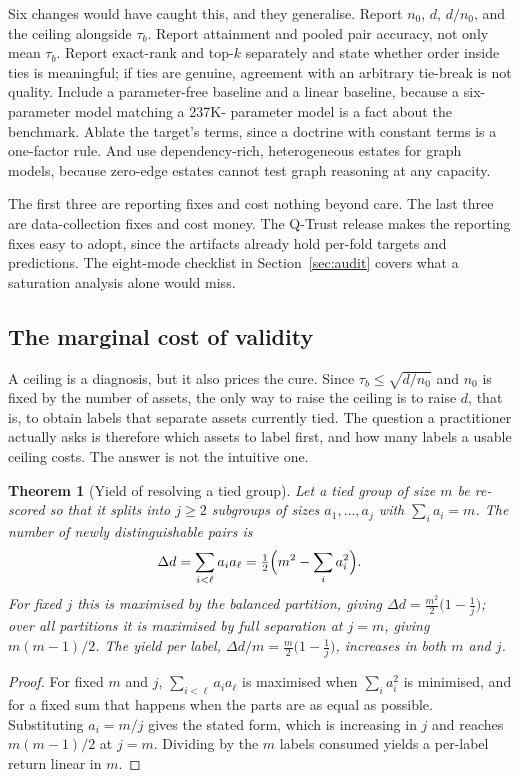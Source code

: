 \documentclass[journal,10pt]{IEEEtran}
\newtheorem{theorem}{Theorem}
\newcommand{\tb}{\tau_b}
\newcommand{\distinct}{d}
\newcommand{\nzero}{n_0}
\begin{document}
Six changes would have caught this, and they generalise. Report $\nzero$, $\distinct$,
$\distinct/\nzero$, and the ceiling alongside $\tb$. Report attainment and pooled pair accuracy, not
only mean $\tb$. Report exact-rank and top-$k$ separately and state whether order inside ties is
meaningful; if ties are genuine, agreement with an arbitrary tie-break is not quality. Include a
parameter-free baseline and a linear baseline, because a six-parameter model matching a 237K-
parameter model is a fact about the benchmark. Ablate the target's terms, since a doctrine with
constant terms is a one-factor rule. And use dependency-rich, heterogeneous estates for graph
models, because zero-edge estates cannot test graph reasoning at any capacity.

The first three are reporting fixes and cost nothing beyond care. The last three are data-collection
fixes and cost money. The Q-Trust release makes the reporting fixes easy to adopt, since the
artifacts already hold per-fold targets and predictions. The eight-mode checklist in
Section~\ref{sec:audit} covers what a saturation analysis alone would miss.

\subsection{The marginal cost of validity}
\label{sec:marginal}

A ceiling is a diagnosis, but it also prices the cure. Since $\tb\le\sqrt{\distinct/\nzero}$ and
$\nzero$ is fixed by the number of assets, the only way to raise the ceiling is to raise $\distinct$,
that is, to obtain labels that separate assets currently tied. The question a practitioner actually
asks is therefore which assets to label first, and how many labels a usable ceiling costs. The
answer is not the intuitive one.

\begin{theorem}[Yield of resolving a tied group]
\label{thm:bisect}
Let a tied group of size $m$ be re-scored so that it splits into $j\ge2$ subgroups of sizes
$a_1,\dots,a_j$ with $\sum_i a_i=m$. The number of newly distinguishable pairs is
\begin{equation}
\Delta\distinct=\sum_{i<\ell}a_i a_\ell=\tfrac{1}{2}\Bigl(m^2-\sum_i a_i^2\Bigr).
\label{eq:bisect}
\end{equation}
For fixed $j$ this is maximised by the balanced partition, giving
$\Delta\distinct=\frac{m^2}{2}\bigl(1-\frac{1}{j}\bigr)$; over all partitions it is maximised by
full separation at $j=m$, giving $m(m-1)/2$. The yield per label,
$\Delta\distinct/m=\frac{m}{2}\bigl(1-\frac{1}{j}\bigr)$, increases in both $m$ and $j$.
\end{theorem}
\begin{proof}
For fixed $m$ and $j$, $\sum_{i<\ell}a_ia_\ell$ is maximised when $\sum_i a_i^2$ is minimised, and
for a fixed sum that happens when the parts are as equal as possible. Substituting $a_i=m/j$ gives
the stated form, which is increasing in $j$ and reaches $m(m-1)/2$ at $j=m$. Dividing by the $m$
labels consumed yields a per-label return linear in $m$.
\end{proof}
\end{document}
